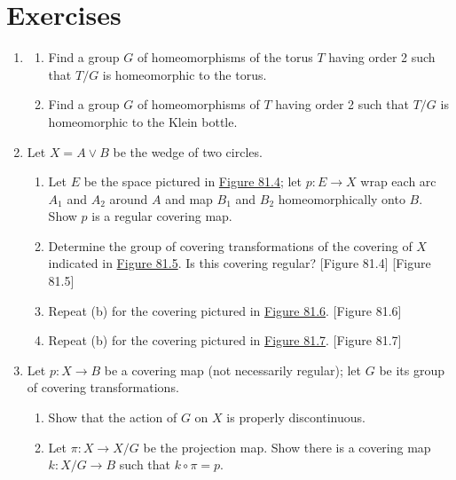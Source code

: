 \section*{Exercises}
\begin{enumerate}[itemsep=0.4em, parsep=0pt, topsep=0pt, partopsep=0pt, leftmargin=*, label=\arabic*., ref=\arabic*]
\item
 \begin{enumerate}[itemsep=0.2em, parsep=0pt, topsep=0pt, partopsep=0pt, leftmargin=*, label=(\alph*), align=left]
 \item Find a group \(G\) of homeomorphisms of the torus \(T\) having order 2 such that \(T/G\) is homeomorphic to the torus.

 \item Find a group \(G\) of homeomorphisms of \(T\) having order 2 such that \(T/G\) is homeomorphic to the Klein bottle.
 \end{enumerate}
\item Let \(X = A \vee B\) be the wedge of two circles.
 \begin{enumerate}[itemsep=0.2em, parsep=0pt, topsep=0pt, partopsep=0pt, leftmargin=*, label=(\alph*), align=left]
 \item Let \(E\) be the space pictured in \hyperref[fig:81.4]{Figure 81.4}; let \(p : E \rightarrow X\) wrap each arc \(A_{1}\) and \(A_{2}\) around \(A\) and map \(B_{1}\) and \(B_{2}\) homeomorphically onto \(B\). Show \(p\) is a regular covering map.
 \item Determine the group of covering transformations of the covering of \(X\) indicated in \hyperref[fig:81.5]{Figure 81.5}. Is this covering regular? [Figure 81.4] [Figure 81.5]
 \item Repeat (b) for the covering pictured in \hyperref[fig:81.6]{Figure 81.6}. [Figure 81.6]
 \item Repeat (b) for the covering pictured in \hyperref[fig:81.7]{Figure 81.7}. [Figure 81.7]
 \end{enumerate}
\item Let \(p : X \rightarrow B\) be a covering map (not necessarily regular); let \(G\) be its group of covering transformations.
 \begin{enumerate}[itemsep=0.2em, parsep=0pt, topsep=0pt, partopsep=0pt, leftmargin=*, label=(\alph*), align=left]
 \item Show that the action of \(G\) on \(X\) is properly discontinuous.
 \item Let \(\pi : X \rightarrow X/G\) be the projection map. Show there is a covering map \(k : X/G \rightarrow B\) such that \(k \circ \pi = p\). %

\end{enumerate}
\end{enumerate}
